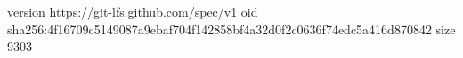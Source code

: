 version https://git-lfs.github.com/spec/v1
oid sha256:4f16709c5149087a9ebaf704f142858bf4a32d0f2c0636f74edc5a416d870842
size 9303
